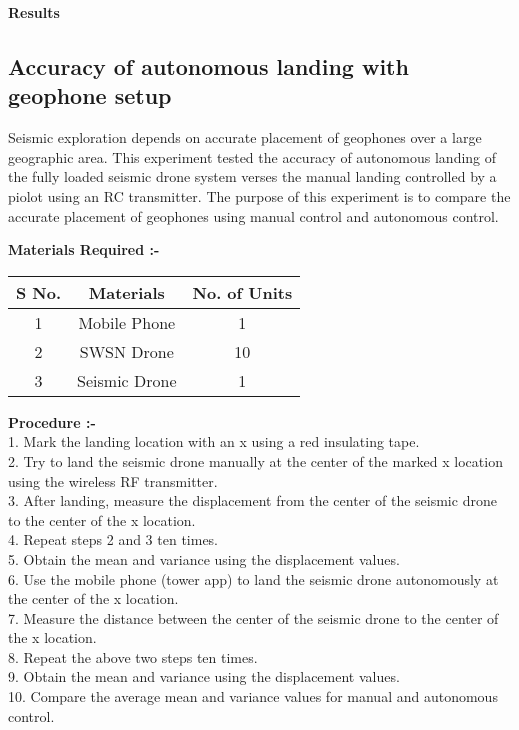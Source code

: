 \documentclass[conference]{IEEEtran}
\begin{document}
\textbf{Results}



\subsection{Accuracy of autonomous landing with geophone setup}
Seismic exploration depends on accurate placement of geophones over a large geographic area.  This experiment tested the accuracy of autonomous landing of the fully loaded seismic drone system verses the manual landing controlled by a piolot using an RC transmitter. The purpose of this experiment is to compare the accurate placement of geophones using manual control and autonomous control.

\textbf{Materials Required :-}
\begin{center}
 \begin{tabular}{||c c c||} 
 \hline
 S No. & Materials & No. of Units \\ [0.5ex] 
 \hline\hline
1 &	Mobile Phone &	1 \\ 
 \hline
2 & SWSN Drone &	10 \\
 \hline
3 &	Seismic Drone &	1 \\ [1ex] 
 \hline
\end{tabular}
\end{center}


\textbf{Procedure :-}\\
1.	Mark the landing location with an x using a red insulating tape.\\
2.	Try to land the seismic drone manually at the center of the marked x location using the wireless RF transmitter.\\
3.	After landing, measure the displacement from the center of the seismic drone to the center of the x location.\\
4.	Repeat steps 2 and 3 ten times.\\
5.	Obtain the mean and variance using the displacement values.\\
6.	Use the mobile phone (tower app) to land the seismic drone autonomously at the center of the x location.\\
7.	 Measure the distance between the center of the seismic drone to the center of the x location.\\
8.	Repeat the above two steps ten times.\\
9.	Obtain the mean and variance using the displacement values.\\
10.	Compare the average mean and variance values for manual and autonomous control.
\end{document}
